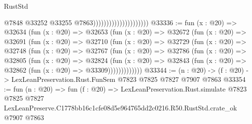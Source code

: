 \begin{lexlean}{RustStd}
\begin{coremodule}
                                              @7848
                                              @33252
                                              @33255
                                              @7863)))))))))))))))))))))
@33336 := fun (x : @20) =>
  @32634
    (fun (x : @20) =>
    @32653
      (fun (x : @20) =>
      @32672
        (fun (x : @20) =>
        @32691
          (fun (x : @20) =>
          @32710
            (fun (x : @20) =>
            @32729
              (fun (x : @20) =>
              @32748
                (fun (x : @20) =>
                @32767
                  (fun (x : @20) =>
                  @32786
                    (fun (x : @20) =>
                    @32805
                      (fun (x : @20) =>
                      @32824
                        (fun (x : @20) =>
                        @32843 (fun (x : @20) => @32862 (fun (x : @20) => @33309)))))))))))))
@33344 := (n : @20) -> (f : @20) -> LexLeanPreservation.Rust.FunSem @7823 @7825 @7827 @7907 @7863
@33354 := fun (n : @20) =>
  fun (f : @20) =>
  LexLeanPreservation.Rust.simulate
    @7823
    @7825
    @7827
    LexLeanPreserve.C1778bb16c1cfe08d5e964765dd2c0216.R50.RustStd.crate_ok
    @7907
    @7863
\end{coremodule}
\end{lexlean}
